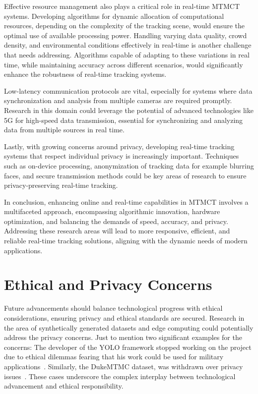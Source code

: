 Effective resource management also plays a critical role in real-time MTMCT systems. Developing algorithms for dynamic allocation of computational resources, depending on the complexity of the tracking scene, would ensure the optimal use of available processing power. Handling varying data quality, crowd density, and environmental conditions effectively in real-time is another challenge that needs addressing. Algorithms capable of adapting to these variations in real time, while maintaining accuracy across different scenarios, would significantly enhance the robustness of real-time tracking systems.

Low-latency communication protocols are vital, especially for systems where data synchronization and analysis from multiple cameras are required promptly. Research in this domain could leverage the potential of advanced technologies like 5G for high-speed data transmission, essential for synchronizing and analyzing data from multiple sources in real time.

Lastly, with growing concerns around privacy, developing real-time tracking systems that respect individual privacy is increasingly important. Techniques such as on-device processing, anonymization of tracking data for example blurring faces, and secure transmission methods could be key areas of research to ensure privacy-preserving real-time tracking.

In conclusion, enhancing online and real-time capabilities in MTMCT involves a multifaceted approach, encompassing algorithmic innovation, hardware optimization, and balancing the demands of speed, accuracy, and privacy. Addressing these research areas will lead to more responsive, efficient, and reliable real-time tracking solutions, aligning with the dynamic needs of modern applications.

\section{Ethical and Privacy Concerns}\label{sec:ethical_and_privacy_concerns}
Future advancements should balance technological progress with ethical considerations, ensuring privacy and ethical standards are secured. Research in the area of synthetically generated datasets and edge computing could potentially address the privacy concerns. Just to mention two significant examples for the concerns: The developer of the YOLO framework stopped working on the project due to ethical dilemmas fearing that his work could be used for military applications~\cite{Synced20}. Similarly, the DukeMTMC dataset, was withdrawn over privacy issues~\cite{Harvey21}. These cases underscore the complex interplay between technological advancement and ethical responsibility.